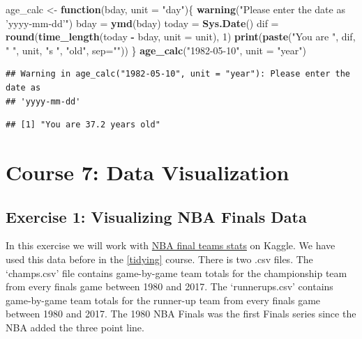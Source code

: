 \documentclass[]{book}
\newenvironment{Shaded}{\begin{snugshade}}{\end{snugshade}}
\newcommand{\ControlFlowTok}[1]{\textcolor[rgb]{0.13,0.29,0.53}{\textbf{#1}}}
\newcommand{\DataTypeTok}[1]{\textcolor[rgb]{0.13,0.29,0.53}{#1}}
\newcommand{\DecValTok}[1]{\textcolor[rgb]{0.00,0.00,0.81}{#1}}
\newcommand{\KeywordTok}[1]{\textcolor[rgb]{0.13,0.29,0.53}{\textbf{#1}}}
\newcommand{\NormalTok}[1]{#1}
\newcommand{\OperatorTok}[1]{\textcolor[rgb]{0.81,0.36,0.00}{\textbf{#1}}}
\newcommand{\StringTok}[1]{\textcolor[rgb]{0.31,0.60,0.02}{#1}}
\begin{document}
\begin{Shaded}
\begin{Highlighting}[]
\NormalTok{age_calc <-}\StringTok{ }\ControlFlowTok{function}\NormalTok{(bday, }\DataTypeTok{unit =} \StringTok{"day"}\NormalTok{)\{}
    \KeywordTok{warning}\NormalTok{(}\StringTok{"Please enter the date as 'yyyy-mm-dd'"}\NormalTok{)}
\NormalTok{    bday =}\StringTok{ }\KeywordTok{ymd}\NormalTok{(bday)}
\NormalTok{    today =}\StringTok{ }\KeywordTok{Sys.Date}\NormalTok{()}
\NormalTok{    dif =}\StringTok{ }\KeywordTok{round}\NormalTok{(}\KeywordTok{time_length}\NormalTok{(today }\OperatorTok{-}\StringTok{ }\NormalTok{bday, }\DataTypeTok{unit =}\NormalTok{ unit), }\DecValTok{1}\NormalTok{)}
    \KeywordTok{print}\NormalTok{(}\KeywordTok{paste}\NormalTok{(}\StringTok{"You are "}\NormalTok{, dif, }\StringTok{" "}\NormalTok{, unit, }\StringTok{"s "}\NormalTok{, }\StringTok{"old"}\NormalTok{, }\DataTypeTok{sep=}\StringTok{""}\NormalTok{))}
\NormalTok{\}}
\KeywordTok{age_calc}\NormalTok{(}\StringTok{"1982-05-10"}\NormalTok{, }\DataTypeTok{unit =} \StringTok{"year"}\NormalTok{)}
\end{Highlighting}
\end{Shaded}

\begin{verbatim}
## Warning in age_calc("1982-05-10", unit = "year"): Please enter the date as
## 'yyyy-mm-dd'
\end{verbatim}

\begin{verbatim}
## [1] "You are 37.2 years old"
\end{verbatim}

\hypertarget{visualization}{%
\chapter*{Course 7: Data Visualization}\label{visualization}}

\hypertarget{exercise-1-visualizing-nba-finals-data}{%
\section*{Exercise 1: Visualizing NBA Finals Data}\label{exercise-1-visualizing-nba-finals-data}}

In this exercise we will work with \href{https://www.kaggle.com/daverosenman/nba-finals-team-stats}{NBA final teams stats} on Kaggle. We have used this data before in the \ref{tidying} course. There is two .csv files. The `champs.csv' file contains game-by-game team totals for the championship team from every finals game between 1980 and 2017. The `runnerups.csv' contains game-by-game team totals for the runner-up team from every finals game between 1980 and 2017. The 1980 NBA Finals was the first Finals series since the NBA added the three point line.
\end{document}
